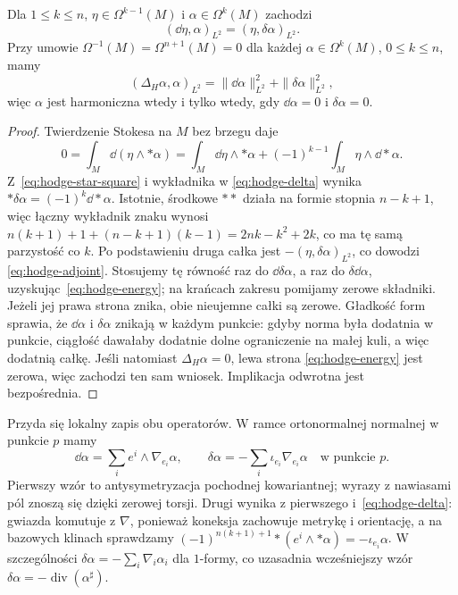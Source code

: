 \begin{stwierdzenie}
\label{prop:hodge-adjoint-energy}
Dla $1\leq k\leq n$, $\eta\in\Omega^{k-1}(M)$ i
$\alpha\in\Omega^k(M)$ zachodzi
\begin{equation}\label{eq:hodge-adjoint}
 (\dd\eta,\alpha)_{L^2}=(\eta,\delta\alpha)_{L^2}.
\end{equation}
Przy umowie $\Omega^{-1}(M)=\Omega^{n+1}(M)=0$ dla
każdej $\alpha\in\Omega^k(M)$, $0\leq k\leq n$, mamy
\begin{equation}\label{eq:hodge-energy}
 (\Delta_H\alpha,\alpha)_{L^2}
 =\|\dd\alpha\|_{L^2}^2+\|\delta\alpha\|_{L^2}^2,
\end{equation}
więc $\alpha$ jest harmoniczna wtedy i tylko wtedy, gdy
$\dd\alpha=0$ i $\delta\alpha=0$.
\end{stwierdzenie}
\begin{proof}
Twierdzenie Stokesa na $M$ bez brzegu daje
\[
 0=\int_M\dd(\eta\wedge*\alpha)
  =\int_M\dd\eta\wedge*\alpha
   +(-1)^{k-1}\int_M\eta\wedge\dd*\alpha.
\]
Z~\eqref{eq:hodge-star-square} i wykładnika w
\eqref{eq:hodge-delta} wynika
$*\delta\alpha=(-1)^k\dd*\alpha$.
Istotnie, środkowe $**$ działa na formie stopnia $n-k+1$,
więc łączny wykładnik znaku wynosi
$n(k+1)+1+(n-k+1)(k-1)=2nk-k^2+2k$,
co ma tę samą parzystość co $k$.
Po podstawieniu druga całka jest
$-(\eta,\delta\alpha)_{L^2}$, co dowodzi
\eqref{eq:hodge-adjoint}. Stosujemy tę równość raz do
$\dd\delta\alpha$, a raz do $\delta\dd\alpha$,
uzyskując~\eqref{eq:hodge-energy}; na krańcach zakresu
pomijamy zerowe składniki.
Jeżeli jej prawa strona znika, obie nieujemne całki są
zerowe. Gładkość form sprawia, że $\dd\alpha$ i
$\delta\alpha$ znikają w każdym punkcie:
gdyby norma była dodatnia w punkcie, ciągłość
dawałaby dodatnie dolne ograniczenie na małej kuli,
a więc dodatnią całkę.
Jeśli natomiast $\Delta_H\alpha=0$, lewa strona
\eqref{eq:hodge-energy} jest zerowa, więc zachodzi ten sam wniosek.
Implikacja
odwrotna jest bezpośrednia.
\end{proof}

Przyda się lokalny zapis obu operatorów.
W ramce ortonormalnej normalnej w punkcie $p$ mamy
\[
 \dd\alpha=\sum_i e^i\wedge\nabla_{e_i}\alpha,\qquad
 \delta\alpha=-\sum_i\iota_{e_i}\nabla_{e_i}\alpha
 \quad\text{w punkcie }p.
\]
Pierwszy wzór to antysymetryzacja pochodnej kowariantnej;
wyrazy z nawiasami pól znoszą się dzięki zerowej torsji.
Drugi wynika z pierwszego i~\eqref{eq:hodge-delta}:
gwiazda komutuje z $\nabla$, ponieważ koneksja zachowuje
metrykę i orientację, a na bazowych klinach sprawdzamy
$(-1)^{n(k+1)+1}*(e^i\wedge*\alpha)=-\iota_{e_i}\alpha$.
W szczególności $\delta\alpha=-\sum_i\nabla_i\alpha_i$
dla $1$-formy, co uzasadnia wcześniejszy wzór
$\delta\alpha=-\operatorname{div}(\alpha^\sharp)$.

